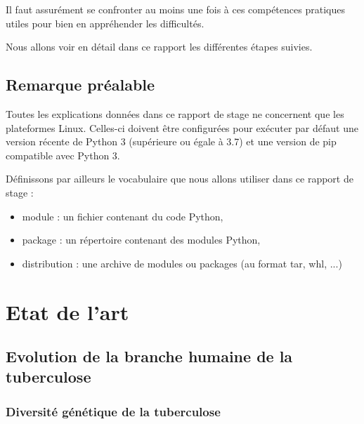\documentclass[twoside,a4paper,11pt,frenchb,openany]{report}
\begin{document}
Il faut assurément se confronter au moins une fois à ces compétences pratiques utiles pour bien en appréhender les difficultés.

Nous allons voir en détail dans ce rapport les différentes étapes suivies.



\section{Remarque préalable}

Toutes les explications données dans ce rapport de stage ne concernent que les plateformes Linux. Celles-ci doivent être configurées pour exécuter par défaut une version récente de Python 3 (supérieure ou égale à 3.7) et une version de pip compatible avec Python 3.

Définissons par ailleurs le vocabulaire que nous allons utiliser dans ce rapport de stage :
\begin{itemize}
\item {}module : un fichier contenant du code Python,
\item package : un répertoire contenant des modules Python,
\item {}distribution : une archive de modules ou packages (au format tar, whl, ...)
\end{itemize}




\chapter{Etat de l'art}



\section{Evolution de la branche humaine de la tuberculose}


\subsection{Diversité génétique de la tuberculose}
\end{document}
